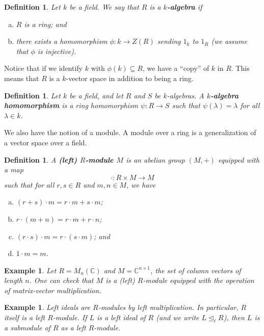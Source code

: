 \documentclass[10pt]{article}
\numberwithin{equation}{section}
\newcommand{\C}{\mathbb{C}}
\theoremstyle{newstyle}
\newtheorem{defn}[thm]{Definition}
\newtheorem{exmp}[thm]{Example}
\begin{document}
\begin{defn}
Let $k$ be a field. We say that $R$ is a {\bf $k$-algebra} if 
\begin{enumerate}[(a)]
    \item $R$ is a ring; and 
    \item there exists a homomorphism $\phi : k \to Z(R)$ sending $1_k$ to $1_R$ (we assume that $\phi$ is injective).
\end{enumerate}
\end{defn}

Notice that if we identify $k$ with $\phi(k) \subseteq R$, we have a ``copy'' of $k$ in $R$. This 
means that $R$ is a $k$-vector space in addition to being a ring. 

\begin{defn}
Let $k$ be a field, and let $R$ and $S$ be $k$-algebras.
A {\bf $k$-algebra homomorphism} is a ring homomorphism $\psi : R \to S$ such that $\psi(\lambda) = \lambda$ for all 
$\lambda \in k$. 
\end{defn}

We also have the notion of a module. A module over a ring is a generalization of a 
vector space over a field. 

\begin{defn}
A {\bf (left) $R$-module $M$} is an abelian group $(M, +)$ equipped with a map 
\[ \cdot : R \times M \to M \] 
such that for all $r, s \in R$ and $m, n \in M$, we have 
\begin{enumerate}[(a)]
    \item $(r + s) \cdot m = r \cdot m + s \cdot m$; 
    \item $r \cdot (m + n) = r \cdot m + r \cdot n$;
    \item $(r \cdot s) \cdot m = r \cdot (s \cdot m)$; and 
    \item $1 \cdot m = m$.
\end{enumerate}
\end{defn}

\begin{exmp}
Let $R = M_n(\C)$ and $M = \C^{n \times 1}$, the set of column vectors of length $n$. One can check that 
$M$ is a (left) $R$-module equipped with the operation of matrix-vector multiplication.
\end{exmp}

\begin{exmp}
Left ideals are $R$-modules by left multiplication. In particular, $R$ itself is a left $R$-module. If 
$L$ is a left ideal of $R$ (and we write $L \trianglelefteq_\ell R$), then $L$ is a 
submodule of $R$ as a left $R$-module.
\end{exmp}
\end{document}

